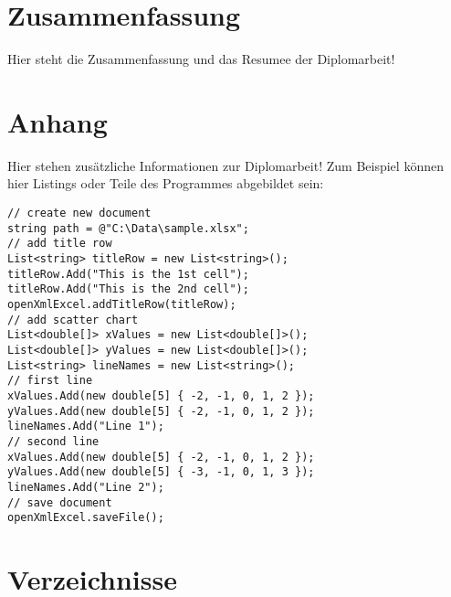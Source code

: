 \section{Zusammenfassung}

Hier steht die Zusammenfassung und das Resumee der Diplomarbeit!
\newpage

\section{Anhang}

Hier stehen zusätzliche Informationen zur Diplomarbeit!
Zum Beispiel können hier Listings oder Teile des Programmes abgebildet sein:

\begin{lstlisting}
// create new document
string path = @"C:\Data\sample.xlsx";
// add title row 
List<string> titleRow = new List<string>();
titleRow.Add("This is the 1st cell");
titleRow.Add("This is the 2nd cell");
openXmlExcel.addTitleRow(titleRow);
// add scatter chart
List<double[]> xValues = new List<double[]>();
List<double[]> yValues = new List<double[]>();
List<string> lineNames = new List<string>();
// first line
xValues.Add(new double[5] { -2, -1, 0, 1, 2 });
yValues.Add(new double[5] { -2, -1, 0, 1, 2 });
lineNames.Add("Line 1");
// second line
xValues.Add(new double[5] { -2, -1, 0, 1, 2 });
yValues.Add(new double[5] { -3, -1, 0, 1, 3 });
lineNames.Add("Line 2");
// save document 
openXmlExcel.saveFile();
\end{lstlisting}

\newpage

\section{Verzeichnisse}
\listoffigures 
%

%
%
%

%